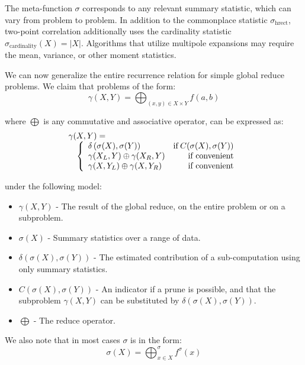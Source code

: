 \documentclass[times, 10pt,twocolumn]{article}
\DeclareMathOperator{\cardinality}{cardinality}
\DeclareMathOperator{\hrect}{hrect}
\DeclareMathOperator{\IF}{if}
\begin{document}
\noindent The meta-function $\sigma$ corresponds to any relevant summary statistic, which can vary from problem to problem.
In addition to the commonplace statistic $\sigma_{\hrect}$, two-point correlation additionally uses the cardinality statistic $\sigma_{\cardinality}(X) = |X|$.
Algorithms that utilize multipole expansions may require the mean, variance, or other moment statistics.

We can now generalize the entire recurrence relation for simple global reduce problems.
We claim that problems of the form:
\begin{equation}
  \gamma(X, Y) = \bigoplus_{(x, y) \in X \times Y} f(a,b)
\end{equation}

\noindent where $\bigoplus$ is any commutative and associative operator, can be expressed as:
\begin{equation}
\label{eqn:global_intrinsic}
 \begin{array}{ll}
  \lefteqn{\gamma(X, Y) =}
  \\
  & \left\{
    \begin{array}{lr}
      \delta \left( \sigma(X), \sigma(Y) \right) & \IF C(\sigma(X), \sigma(Y))
      \\
      \gamma(X_L, Y) \oplus \gamma(X_R, Y) & \mbox{if convenient}
      \\
      \gamma(X, Y_L) \oplus  \gamma(X, Y_R) & \mbox{if convenient}
    \end{array}
  \right.
 \end{array}
\end{equation}

\noindent under the following model:
\begin{itemize}
  \item $\gamma(X, Y)$ - The result of the global reduce, on the entire problem or on a subproblem.
  \item $\sigma(X)$ - Summary statistics over a range of data.
  \item $\delta(\sigma(X), \sigma(Y))$ - The estimated contribution of a sub-computation using only summary statistics.
  \item $C(\sigma(X), \sigma(Y))$ - An indicator if a prune is possible, and that the subproblem $\gamma(X, Y)$ can be substituted by $\delta(\sigma(X), \sigma(Y))$.
  \item $\bigoplus$ - The reduce operator.
\end{itemize}

\noindent We also note that in most cases $\sigma$ is in the form:
\begin{equation}
  \sigma(X) = \bigoplus^{\sigma}_{x \in X} f^{\sigma}(x)
\end{equation}
\end{document}
